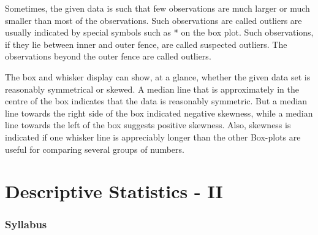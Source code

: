 \documentclass[
10pt, %
a4paper, %
]{report}
\begin{document}
Sometimes, the given data is such that few observations are much larger or much smaller than most of the observations. Such observations are called outliers are usually indicated by special symbols such as * on the box plot. Such observations, if they lie between inner and outer fence, are called suspected outliers. The observations beyond the outer fence are called outliers.

The box and whisker display can show, at a glance, whether the given data set is reasonably symmetrical or skewed. A median line that is approximately in the centre of the box indicates that the data is reasonably symmetric. But a median line towards the right side of the box indicated negative skewness, while a median line towards the left of the box suggests positive skewness. Also, skewness is indicated if one whisker line is appreciably longer than the other Box-plots are useful for comparing several groups of numbers.




\part{Descriptive Statistics - II}

\section{Syllabus}
\end{document}
